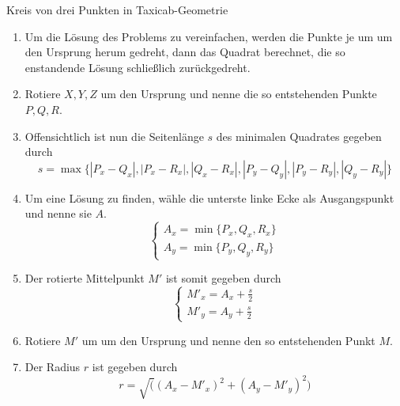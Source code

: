 \documentclass{article}
\begin{document}
\begin{algorithm}[H]
    \caption{Kreis von drei Punkten in Taxicab-Geometrie}
    \BlankLine
    \begin{enumerate}
    \item Um die Lösung des Problems zu vereinfachen, werden die Punkte je um \unit[45]{\textdegree} um den
    Ursprung herum gedreht, dann das Quadrat berechnet, die so enstandende Lösung schließlich zurückgedreht.
    \item Rotiere $X, Y, Z$ \unit[45]{\textdegree} um den Ursprung und nenne die so entstehenden Punkte $P, Q, R$.
    \item Offensichtlich ist nun die Seitenlänge $s$ des minimalen Quadrates gegeben durch
    \begin{equation}
    s = \max\{|P_x-Q_x|,|P_x-R_x|,|Q_x-R_x|,|P_y-Q_y|,|P_y-R_y|,|Q_y-R_y|\}
    \end{equation}
    \item Um eine Lösung zu finden, wähle die unterste linke Ecke als Ausgangspunkt und nenne sie $A$.
    \begin{equation}
    \begin{cases}
    A_x = \min\{P_x,Q_x,R_x\}\\
    A_y = \min\{P_y,Q_y,R_y\}
    \end{cases}
    \end{equation}
    \item Der rotierte Mittelpunkt $M'$ ist somit gegeben durch
    \begin{equation}
    \begin{cases}
    M'_x = A_x + \frac{s}{2}\\
    M'_y = A_y + \frac{s}{2}
    \end{cases}
    \end{equation}
    \item Rotiere $M'$ um \unit[45]{\textdegree} um den Ursprung und nenne den so entstehenden Punkt $M$.
    \item Der Radius $r$ ist gegeben durch 
    \begin{equation}
    r = \sqrt( (A_x - M'_x) ^ 2 + (A_y - M'_y) ^ 2 )     
    \end{equation}
    \end{enumerate}
\end{algorithm}
\end{document}
